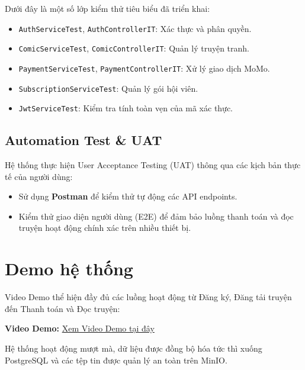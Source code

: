 Dưới đây là một số lớp kiểm thử tiêu biểu đã triển khai:
\begin{itemize}
    \item \texttt{AuthServiceTest}, \texttt{AuthControllerIT}: Xác thực và phân quyền.
    \item \texttt{ComicServiceTest}, \texttt{ComicControllerIT}: Quản lý truyện tranh.
    \item \texttt{PaymentServiceTest}, \texttt{PaymentControllerIT}: Xử lý giao dịch MoMo.
    \item \texttt{SubscriptionServiceTest}: Quản lý gói hội viên.
    \item \texttt{JwtServiceTest}: Kiểm tra tính toàn vẹn của mã xác thực.
\end{itemize}

\subsection{Automation Test \& UAT}
Hệ thống thực hiện User Acceptance Testing (UAT) thông qua các kịch bản thực tế của người dùng:
\begin{itemize}
    \item Sử dụng \textbf{Postman} để kiểm thử tự động các API endpoints.
    \item Kiểm thử giao diện người dùng (E2E) để đảm bảo luồng thanh toán và đọc truyện hoạt động chính xác trên nhiều thiết bị.
\end{itemize}

\section{Demo hệ thống}
Video Demo thể hiện đầy đủ các luồng hoạt động từ Đăng ký, Đăng tải truyện đến Thanh toán và Đọc truyện:

\textbf{Video Demo:} \href{https://youtu.be/h_Qce4Uvx9A}{Xem Video Demo tại đây}

Hệ thống hoạt động mượt mà, dữ liệu được đồng bộ hóa tức thì xuống PostgreSQL và các tệp tin được quản lý an toàn trên MinIO.
